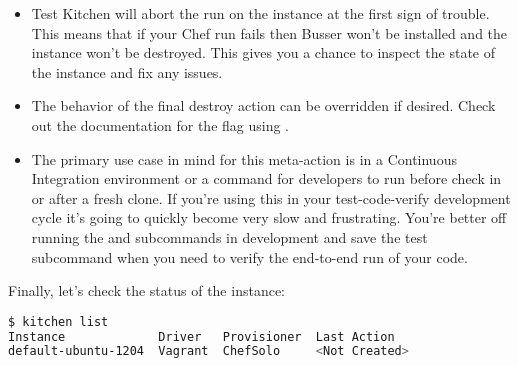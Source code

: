 \begin{itemize}
  \item Test Kitchen will abort the run on the instance at the first sign of trouble. This means that if your Chef run fails then Busser won't be installed and the instance won't be destroyed. This gives you a chance to inspect the state of the instance and fix any issues.
  \item The behavior of the final destroy action can be overridden if desired. Check out the documentation for the  flag using .
  \item The primary use case in mind for this meta-action is in a Continuous Integration environment or a command for developers to run before check in or after a fresh clone. If you're using this in your test-code-verify development cycle it's going to quickly become very slow and frustrating. You're better off running the  and  subcommands in development and save the test subcommand when you need to verify the end-to-end run of your code.
\end{itemize}

Finally, let's check the status of the instance:

\begin{lstlisting}[language=Bash,label=lst:testing-test-kitchen19]
$ kitchen list
Instance             Driver   Provisioner  Last Action
default-ubuntu-1204  Vagrant  ChefSolo     <Not Created>
\end{lstlisting}